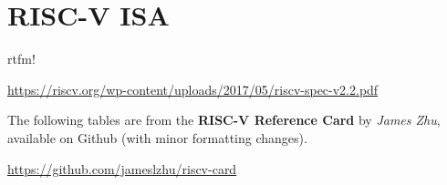 \section{RISC-V ISA}
rtfm!

\url{https://riscv.org/wp-content/uploads/2017/05/riscv-spec-v2.2.pdf}

\newpar{}

The following tables are from the \textbf{RISC-V Reference Card} by \textit{James Zhu}, available on Github (with minor formatting changes).

\url{https://github.com/jameslzhu/riscv-card}

\newcommand{\instbit}[1]{\mbox{\scriptsize #1}}
\newcommand{\instbitrange}[2]{~\instbit{#1} \hfill \instbit{#2}~}

